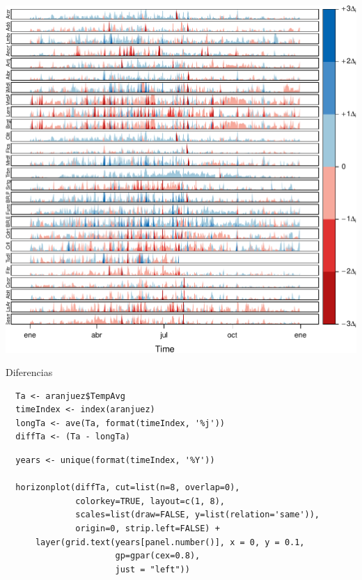 \documentclass[xcolor={usenames,svgnames,dvipsnames}]{beamer}
\begin{document}
\begin{frame}[label=sec-3-3-2]{}
\includegraphics[width=.9\linewidth]{figs/navarraHorizonplot.pdf}
\end{frame}

\begin{frame}[fragile,label=sec-3-3-3]{Diferencias}
 \lstset{language=R,label= ,caption= ,numbers=none}
\begin{lstlisting}
  Ta <- aranjuez$TempAvg
  timeIndex <- index(aranjuez)
  longTa <- ave(Ta, format(timeIndex, '%j'))
  diffTa <- (Ta - longTa)
\end{lstlisting}


\lstset{language=R,label= ,caption= ,numbers=none}
\begin{lstlisting}
  years <- unique(format(timeIndex, '%Y'))
  
  horizonplot(diffTa, cut=list(n=8, overlap=0),
              colorkey=TRUE, layout=c(1, 8),
              scales=list(draw=FALSE, y=list(relation='same')),
              origin=0, strip.left=FALSE) +
      layer(grid.text(years[panel.number()], x = 0, y = 0.1, 
                      gp=gpar(cex=0.8),
                      just = "left"))
\end{lstlisting}
\end{frame}
\end{document}
